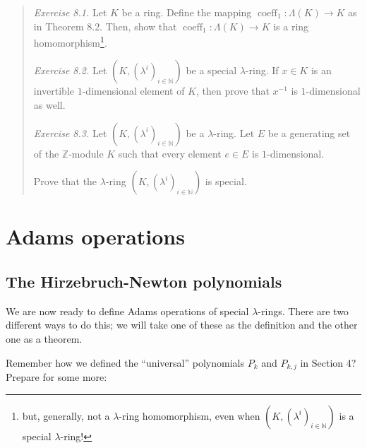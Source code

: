 \documentclass[numbers=enddot,12pt,final,onecolumn,notitlepage]{scrartcl}%
\begin{document}
\begin{quotation}
\textit{Exercise 8.1.} Let $K$ be a ring. Define the mapping
$\operatorname*{coeff}\nolimits_{1}:\Lambda\left(  K\right)  \rightarrow K$ as
in Theorem 8.2. Then, show that $\operatorname*{coeff}\nolimits_{1}%
:\Lambda\left(  K\right)  \rightarrow K$ is a ring homomorphism\footnote{but,
generally, not a $\lambda$-ring homomorphism, even when $\left(  K,\left(
\lambda^{i}\right)  _{i\in\mathbb{N}}\right)  $ is a special $\lambda$-ring!}.

\textit{Exercise 8.2.} Let $\left(  K,\left(  \lambda^{i}\right)
_{i\in\mathbb{N}}\right)  $ be a special $\lambda$-ring. If $x\in K$ is an
invertible $1$-dimensional element of $K$, then prove that $x^{-1}$ is
$1$-dimensional as well.

\textit{Exercise 8.3.} Let $\left(  K,\left(  \lambda^{i}\right)
_{i\in\mathbb{N}}\right)  $ be a $\lambda$-ring. Let $E$ be a generating set
of the $\mathbb{Z}$-module $K$ such that every element $e\in E$ is $1$-dimensional.

Prove that the $\lambda$-ring $\left(  K,\left(  \lambda^{i}\right)
_{i\in\mathbb{N}}\right)  $ is special.
\end{quotation}

\section{Adams operations}

\subsection{The Hirzebruch-Newton polynomials}

We are now ready to define Adams operations of special $\lambda$-rings. There
are two different ways to do this; we will take one of these as the definition
and the other one as a theorem.

Remember how we defined the ``universal'' polynomials $P_{k}$ and $P_{k,j}$ in
Section 4? Prepare for some more:
\end{document}
